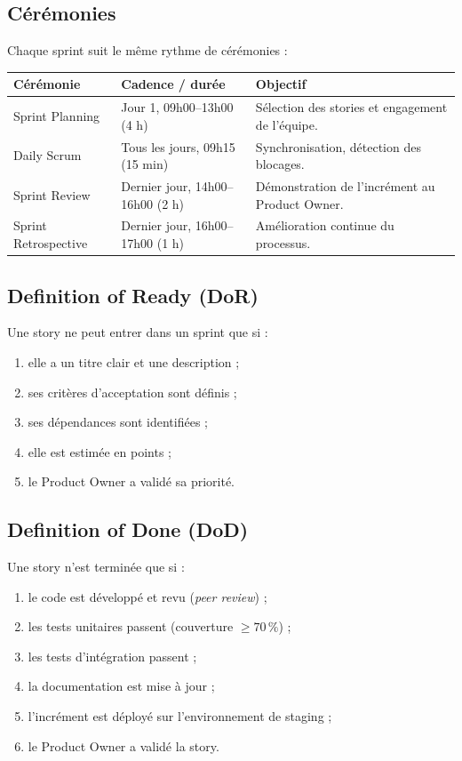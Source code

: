 \subsection{Cérémonies}

Chaque sprint suit le même rythme de cérémonies :

\begin{center}
\begin{tabular}{llp{6.6cm}}
\toprule
\textbf{Cérémonie} & \textbf{Cadence / durée} & \textbf{Objectif} \\
\midrule
Sprint Planning       & Jour 1, 09h00--13h00 (4 h) & Sélection des stories et
                        engagement de l'équipe. \\
Daily Scrum           & Tous les jours, 09h15 (15 min) & Synchronisation,
                        détection des blocages. \\
Sprint Review         & Dernier jour, 14h00--16h00 (2 h) & Démonstration de
                        l'incrément au Product Owner. \\
Sprint Retrospective  & Dernier jour, 16h00--17h00 (1 h) & Amélioration
                        continue du processus. \\
\bottomrule
\end{tabular}
\end{center}

\subsection{Definition of Ready (DoR)}

Une story ne peut entrer dans un sprint que si :
\begin{enumerate}
  \item elle a un titre clair et une description ;
  \item ses critères d'acceptation sont définis ;
  \item ses dépendances sont identifiées ;
  \item elle est estimée en points ;
  \item le Product Owner a validé sa priorité.
\end{enumerate}

\subsection{Definition of Done (DoD)}

Une story n'est terminée que si :
\begin{enumerate}
  \item le code est développé et revu (\emph{peer review}) ;
  \item les tests unitaires passent (couverture $\geq 70\,\%$) ;
  \item les tests d'intégration passent ;
  \item la documentation est mise à jour ;
  \item l'incrément est déployé sur l'environnement de staging ;
  \item le Product Owner a validé la story.
\end{enumerate}

